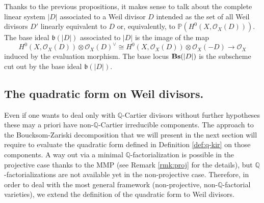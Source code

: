 \documentclass[12pt,reqno]{amsart}
\def\Q{{\mathbb Q}}
\theoremstyle{plain}
\theoremstyle{definition}
\begin{document}
Thanks to the previous propositions, it makes sense to talk about the complete linear system $|D|$ associated to a Weil divisor $D$ intended as the set of all Weil divisors $D'$ linearly equivalent to $D$ or, equivalently, to $\mathbb P (H^0(X, \mathcal O_X(D)))$. The base ideal $\mathfrak {b} (|D|)$ associated to $|D|$ is the image of the map 
$$
 H^0(X, \mathcal O_X(D))\otimes \mathcal O_X(D)^\vee\cong H^0(X, \mathcal O_X(D))\otimes \mathcal O_X(-D) \to \mathcal O_X
$$
induced by the evaluation morphism.
The base locus ${\bf Bs}(|D|)$ is the subscheme cut out by the base ideal $\mathfrak {b} (|D|)$.

\subsection{The quadratic form on Weil divisors.}\label{ss:q_on_Weil}
Even if one wants to deal only with $\Q$-Cartier divisors without further hypotheses these may a priori have non-$\Q$-Cartier irreducible components. The approach to the Boucksom-Zariski decomposition that we will present in the next section will require to evaluate the quadratic form defined in Definition \ref{def:q-kir} on those components. A  way out via a minimal $\Q$-factorialization is possible in the projective case thanks to the MMP (see Remark \ref{rmk:proj} for the details), but $\Q$-factorializations are not available yet in the non-projective case. 
Therefore, in order to deal with the most general framework (non-projective, non-$\Q$-factorial varieties), we extend the definition of the quadratic form to Weil divisors. 
\end{document}
